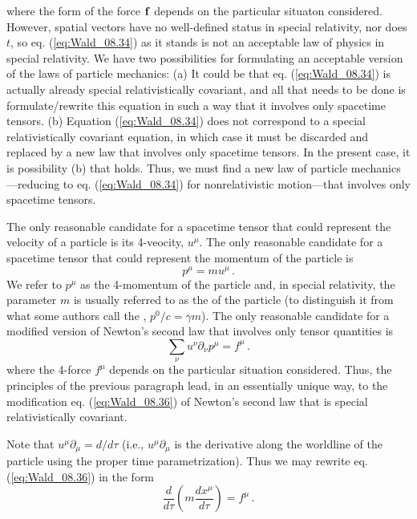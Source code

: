 where the form of the force $\vb{f}$ depends on the particular situaton considered. However, spatial vectors have no well-defined status in special relativity, nor does $t$, so eq. (\ref{eq:Wald_08.34}) as it stands is not an acceptable law of physics in special relativity. We have two possibilities for formulating an acceptable version of the laws of particle mechanics: (a) It could be that eq. (\ref{eq:Wald_08.34}) is actually already special relativistically covariant, and all that needs to be done is formulate/rewrite this equation in such a way that it involves only spacetime tensors. (b) Equation (\ref{eq:Wald_08.34}) does not correspond to a special relativistically covariant equation, in which case it must be discarded and replaced by a new law that involves only spacetime tensors. In the present case, it is possibility (b) that holds. Thus, we must find a new law of particle mechanics---reducing to eq. (\ref{eq:Wald_08.34}) for nonrelativistic motion---that involves only spacetime tensors. 

The only reasonable candidate for a spacetime tensor that could represent the velocity of a particle is its 4-veocity, $u^\mu$. The only reasonable candidate for a spacetime tensor that could represent the momentum of the particle is 
\begin{equation}\label{eq:Wald_08.35}
p^\mu = m u^\mu\,.
\end{equation}
We refer to $p^\mu$ as the 4-momentum of the particle and, in special relativity, the parameter $m$ is usually referred to as the  of the particle (to distinguish it from what some authors call the , $p^0/c = \gamma m$). The only reasonable candidate for a modified version of Newton's second law that involves only tensor quantities is 
\begin{equation}\label{eq:Wald_08.36}
\sum_\nu u^\nu \partial_\nu p^\mu = f^\mu\,.
\end{equation}
where the 4-force $f^\mu$ depends on the particular situation considered. Thus, the principles of the previous paragraph lead, in an essentially unique way, to the modification eq. (\ref{eq:Wald_08.36}) of Newton's second law that is special relativistically covariant. 

Note that $u^\mu \partial_\mu = d/d\tau$ (i.e., $u^\mu \partial_\mu$ is the derivative along the worldline of the particle using the proper time parametrization). Thus we may rewrite eq. (\ref{eq:Wald_08.36}) in the form
\begin{equation}\label{eq:Wald_08.37}
\frac{d}{d\tau} \left(m \frac{d x^\mu}{d \tau} \right) = f^\mu\,.
\end{equation}





